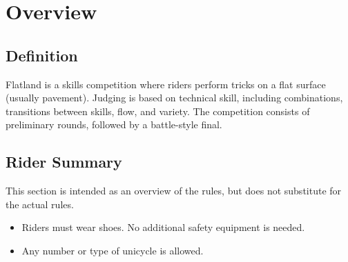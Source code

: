 \chapter{Overview}

\section{Definition}

Flatland is a skills competition where riders perform 
tricks on a flat surface (usually pavement).
Judging is based on technical skill, including combinations, transitions between skills, flow, and variety.
The competition consists of preliminary rounds, followed by a battle-style final.

\section{Rider Summary}

This section is intended as an overview of the rules, but does not
substitute for the actual rules.
\begin{itemize}
\item Riders must wear shoes. No additional safety equipment is needed.
\item Any number or type of unicycle is allowed.
\end{itemize}